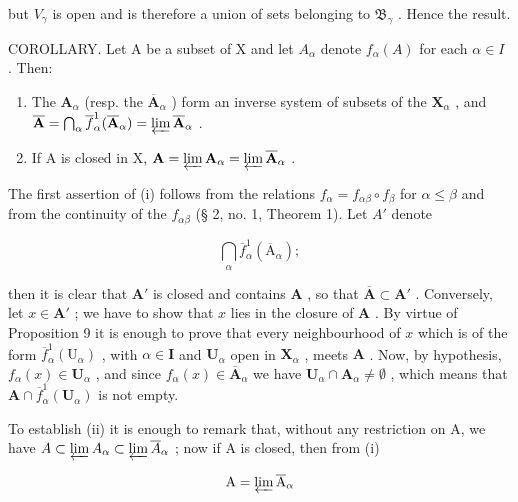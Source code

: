 but \(V_{\gamma}\) is open and is therefore a union of sets belonging to \(\mathfrak{B}_{\gamma}\) . Hence the result.

COROLLARY. Let A be a subset of X and let \(A_{\alpha}\) denote \(f_{\alpha}(A)\) for each \(\alpha \in I\) . Then:

\begin{enumerate}
\def\labelenumi{(\roman{enumi})}
\item
  The \(\mathbf{A}_{\alpha}\) (resp. the \(\overline{\mathbf{A}}_{\alpha}\) ) form an inverse system of subsets of the \(\mathbf{X}_{\alpha}\) , and \(\overline{\mathbf{A}} = \bigcap_{\alpha} \overline{f}_{\alpha}^{1}(\overline{\mathbf{A}}_{\alpha}) = \varprojlim \overline{\mathbf{A}}_{\alpha}\) .
\item
  If A is closed in X, \(\mathbf{A} = \varprojlim \mathbf{A}_{\alpha} = \varprojlim \overline{\mathbf{A}}_{\alpha}\) .
\end{enumerate}

The first assertion of (i) follows from the relations \(f_{\alpha} = f_{\alpha \beta} \circ f_{\beta}\) for \(\alpha \leqslant \beta\) and from the continuity of the \(f_{\alpha \beta}\) (§ 2, no. 1, Theorem 1). Let \(A'\) denote

\[
\bigcap_ {\alpha} \overline {{f}} _ {\alpha} ^ {1} (\overline {{\mathrm{A}}} _ {\alpha});
\]

then it is clear that \(\mathbf{A}'\) is closed and contains \(\mathbf{A}\) , so that \(\overline{\mathbf{A}} \subset \mathbf{A}'\) . Conversely, let \(x \in \mathbf{A}'\) ; we have to show that \(x\) lies in the closure of \(\mathbf{A}\) . By virtue of Proposition 9 it is enough to prove that every neighbourhood of \(x\) which is of the form \(\overline{f}_{\alpha}^{1}(\mathrm{U}_{\alpha})\) , with \(\alpha \in \mathbf{I}\) and \(\mathbf{U}_{\alpha}\) open in \(\mathbf{X}_{\alpha}\) , meets \(\mathbf{A}\) . Now, by hypothesis, \(f_{\alpha}(x) \in \mathbf{U}_{\alpha}\) , and since \(f_{\alpha}(x) \in \overline{\mathbf{A}}_{\alpha}\) we have \(\mathbf{U}_{\alpha} \cap \mathbf{A}_{\alpha} \neq \emptyset\) , which means that \(\mathbf{A} \cap \overline{f}_{\alpha}^{1}(\mathbf{U}_{\alpha})\) is not empty.

To establish (ii) it is enough to remark that, without any restriction on A, we have \(A \subset \varprojlim A_{\alpha} \subset \varprojlim \overline{A}_{\alpha}\) ; now if A is closed, then from (i)

\[
\mathrm{A} = \varprojlim \overline {{\mathrm{A}}} _ {\alpha}
\]

